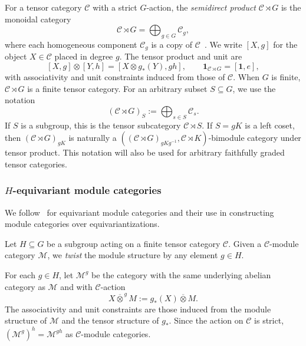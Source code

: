 \documentclass[12pt]{amsart}
\theoremstyle{plain}
\theoremstyle{definition} %
\theoremstyle{remark} %
\newcommand{\cC}{\mathcal{C}}
\newcommand{\cM}{\mathcal{M}}
\begin{document}
For a tensor category $\cC$ with a strict $G$-action, the \emph{semidirect product} $\cC\rtimes G$ is the monoidal category
\[
\cC\rtimes G=\bigoplus_{g\in G}\cC_g,
\]
where each homogeneous component $\cC_g$ is a copy of $\cC$~\cite{T01,Nik08}. We write $[X,g]$ for the object $X\in\cC$ placed in degree $g$. The tensor product and unit are
\begin{equation}\label{eq:semidirect_product_tensor}
[X,g]\otimes[Y,h]=[X\otimes g_*(Y),gh],
\qquad
\mathbf 1_{\cC\rtimes G}=[\mathbf 1,e],
\end{equation}
with associativity and unit constraints induced from those of $\cC$. When $G$ is finite, $\cC\rtimes G$ is a finite tensor category. For an arbitrary subset $S\subseteq G$, we use the notation
\[
(\cC\rtimes G)_S:=\bigoplus_{s\in S}\cC_s.
\]
If $S$ is a subgroup, this is the tensor subcategory $\cC\rtimes S$. If $S=gK$ is a left coset, then $(\cC\rtimes G)_{gK}$ is naturally a
$((\cC\rtimes G)_{gKg^{-1}},\cC\rtimes K)$-bimodule category under tensor product. This notation will also be used for arbitrary faithfully graded tensor categories.

\subsubsection{$H$-equivariant module categories}

We follow~\cite{Gal11, ENO11} for equivariant module categories and their use in constructing module categories over equivariantizations.


Let $H \subseteq G$ be a subgroup acting on a finite tensor category $\cC$. Given a $\cC$-module category $\cM$, we \emph{twist} the module structure by any element $g\in H$.

For each $g\in H$, let $\cM^g$ be the category with the same underlying abelian category as $\cM$ and with $\cC$-action
\[
X\overline{\otimes}^{\,g}M:=g_*(X)\overline{\otimes}M.
\]
The associativity and unit constraints are those induced from the module structure of $\cM$ and the tensor structure of $g_*$. Since the action on $\cC$ is strict, $(\cM^g)^h=\cM^{gh}$ as $\cC$-module categories.
\end{document}
